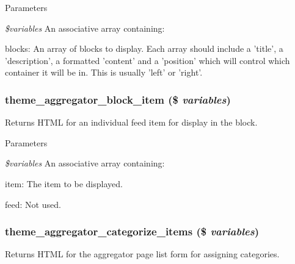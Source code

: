 \begin{DoxyParams}{Parameters}
\item[{\em \$variables}]An associative array containing:
\begin{DoxyItemize}
\item blocks: An array of blocks to display. Each array should include a 'title', a 'description', a formatted 'content' and a 'position' which will control which container it will be in. This is usually 'left' or 'right'. 
\end{DoxyItemize}\end{DoxyParams}
\hypertarget{group__themeable_ga311e62f08cc510fe7e50477485f54943}{
\subsubsection[{theme\_\-aggregator\_\-block\_\-item}]{\setlength{\rightskip}{0pt plus 5cm}theme\_\-aggregator\_\-block\_\-item (\$ {\em variables})}}
\label{group__themeable_ga311e62f08cc510fe7e50477485f54943}
Returns HTML for an individual feed item for display in the block.


\begin{DoxyParams}{Parameters}
\item[{\em \$variables}]An associative array containing:
\begin{DoxyItemize}
\item item: The item to be displayed.
\item feed: Not used. 
\end{DoxyItemize}\end{DoxyParams}
\hypertarget{group__themeable_gaa166f4c160bdff7532ce6b75a8588d02}{
\subsubsection[{theme\_\-aggregator\_\-categorize\_\-items}]{\setlength{\rightskip}{0pt plus 5cm}theme\_\-aggregator\_\-categorize\_\-items (\$ {\em variables})}}
\label{group__themeable_gaa166f4c160bdff7532ce6b75a8588d02}
Returns HTML for the aggregator page list form for assigning categories.


